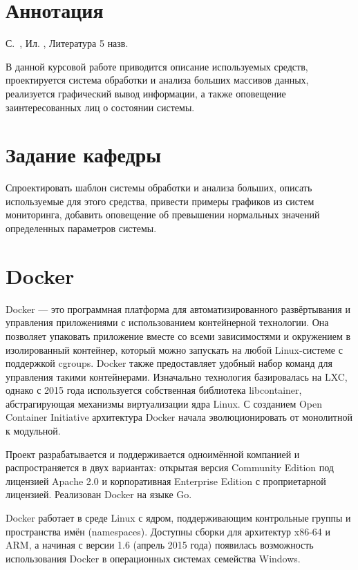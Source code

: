 \documentclass[14pt,a4paper]{extarticle}
\begin{document}
\section{Аннотация}
\begin{sloppypar}
    С.~\pageref{LastPage}, Ил. , Литература 5 назв.

В данной курсовой работе приводится описание используемых средств,
    проектируется система обработки и анализа больших массивов данных,
    реализуется графический вывод информации, а также оповещение
    заинтересованных лиц о состоянии системы.
\end{sloppypar}

\newpage
\section{Задание кафедры}

Спроектировать шаблон системы обработки и анализа больших, описать используемые
для этого средства, привести примеры графиков из систем мониторинга, добавить
оповещение об превышении нормальных значений определенных параметров системы.


\newpage
\section{Docker}
Docker — это программная платформа для автоматизированного развёртывания и
управления приложениями с использованием контейнерной технологии. Она позволяет
упаковать приложение вместе со всеми зависимостями и окружением в изолированный
контейнер, который можно запускать на любой Linux-системе с поддержкой cgroups.
Docker также предоставляет удобный набор команд для управления такими
контейнерами. Изначально технология базировалась на LXC, однако с 2015 года
используется собственная библиотека libcontainer, абстрагирующая механизмы
виртуализации ядра Linux. С созданием Open Container Initiative архитектура
Docker начала эволюционировать от монолитной к модульной.

Проект разрабатывается и поддерживается одноимённой компанией и
распространяется в двух вариантах: открытая версия Community Edition под
лицензией Apache 2.0 и корпоративная Enterprise Edition с проприетарной
лицензией. Реализован Docker на языке Go.

Docker работает в среде Linux с ядром, поддерживающим контрольные группы и
пространства имён (namespaces). Доступны сборки для архитектур x86-64 и ARM, а
начиная с версии 1.6 (апрель 2015 года) появилась возможность использования
Docker в операционных системах семейства Windows.
\end{document}
